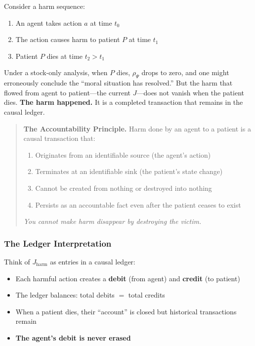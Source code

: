 \documentclass[12pt]{article}
\begin{document}
Consider a harm sequence:
\begin{enumerate}
\item An agent takes action $a$ at time $t_0$
\item The action causes harm to patient $P$ at time $t_1$
\item Patient $P$ dies at time $t_2 > t_1$
\end{enumerate}

Under a stock-only analysis, when $P$ dies, $\rho_\Psi$ drops to zero, and one might erroneously conclude
the ``moral situation has resolved.'' But the harm that flowed from agent to patient---the current
$J$---does not vanish when the patient dies. \textbf{The harm happened.} It is a completed transaction
that remains in the causal ledger.

\begin{quote}
\textbf{The Accountability Principle.} Harm done by an agent to a patient is a causal
transaction that:
\begin{enumerate}
\item Originates from an identifiable source (the agent's action)
\item Terminates at an identifiable sink (the patient's state change)
\item Cannot be created from nothing or destroyed into nothing
\item Persists as an accountable fact even after the patient ceases to exist
\end{enumerate}

\emph{You cannot make harm disappear by destroying the victim.}
\end{quote}

\subsubsection{The Ledger Interpretation}

Think of $J_{\text{harm}}$ as entries in a causal ledger:
\begin{itemize}
\item Each harmful action creates a \textbf{debit} (from agent) and \textbf{credit} (to patient)
\item The ledger balances: total debits $=$ total credits
\item When a patient dies, their ``account'' is closed but historical transactions remain
\item \textbf{The agent's debit is never erased}
\end{itemize}
\end{document}
